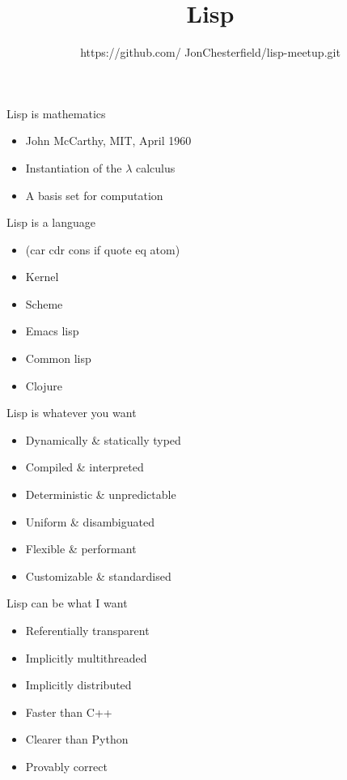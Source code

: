\documentclass[20pt]{beamer}
\title[]{Lisp}
\author[Jon]{https://github.com/
JonChesterfield/lisp-meetup.git}
\begin{document}
\begin{frame}
  \titlepage
\end{frame}

\begin{frame}{Lisp is mathematics}
  \begin{itemize}
  \item John McCarthy, MIT, April 1960
  \item Instantiation of the $\lambda$ calculus
  \item A basis set for computation
  \end{itemize}
\end{frame}

\begin{frame}{Lisp is a language}
  \begin{itemize}
  \item (car cdr cons if quote eq atom)
  \item Kernel
  \item Scheme
  \item Emacs lisp
  \item Common lisp
  \item Clojure
  \end{itemize}
\end{frame}

\begin{frame}{Lisp is whatever you want}
  \begin{itemize}
  \item Dynamically \& statically typed
  \item Compiled \& interpreted
  \item Deterministic \& unpredictable
  \item Uniform \& disambiguated
  \item Flexible \& performant
  \item Customizable \& standardised
  \end{itemize}
\end{frame}

\begin{frame}{Lisp can be what I want}
  \begin{itemize}
  \item Referentially transparent
  \item Implicitly multithreaded
  \item Implicitly distributed
  \item Faster than C++
  \item Clearer than Python
  \item Provably correct
  \end{itemize}
\end{frame}
\end{document}
